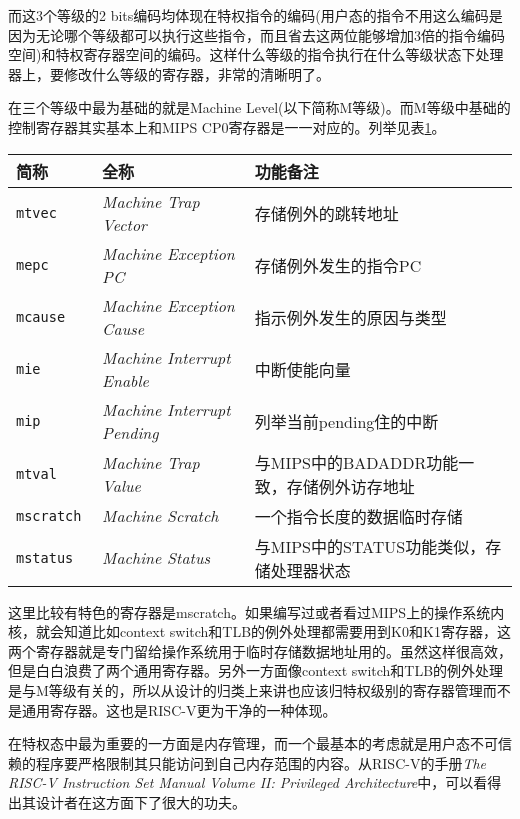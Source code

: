 \begin{enumerate}
	而这3个等级的2 bits编码均体现在特权指令的编码(用户态的指令不用这么编码是因为无论哪个等级都可以执行这些指令，而且省去这两位能够增加3倍的指令编码空间)和特权寄存器空间的编码。这样什么等级的指令执行在什么等级状态下处理器上，要修改什么等级的寄存器，非常的清晰明了。
	
	在三个等级中最为基础的就是Machine Level(以下简称M等级)。而M等级中基础的控制寄存器其实基本上和MIPS CP0寄存器是一一对应的。列举见表\ref{tab:sampleofCSR}。
	\begin{table}[!htbp]
		\label{tab:sampleofCSR}
		\centering
		\footnotesize%
		\setlength{\tabcolsep}{4pt}%
		\renewcommand{\arraystretch}{1.2}%
		\begin{tabular}{lll}
			\hline
			简称 & 全称 & 功能备注 \\%
			\hline
			\tt mtvec    & \textit{Machine Trap Vector}       & 存储例外的跳转地址 \\
			\tt mepc     & \textit{Machine Exception PC}      & 存储例外发生的指令PC \\
			\tt mcause   & \textit{Machine Exception Cause}   & 指示例外发生的原因与类型 \\
			\tt mie      & \textit{Machine Interrupt Enable}  & 中断使能向量 \\
			\tt mip      & \textit{Machine Interrupt Pending} & 列举当前pending住的中断 \\
			\tt mtval    & \textit{Machine Trap Value} & 与MIPS中的BADADDR功能一致，存储例外访存地址 \\
			\tt mscratch & \textit{Machine Scratch}    & 一个指令长度的数据临时存储 \\
			\tt mstatus  & \textit{Machine Status}     & 与MIPS中的STATUS功能类似，存储处理器状态 \\
			\hline
		\end{tabular}
	\end{table}
	
	这里比较有特色的寄存器是mscratch。如果编写过或者看过MIPS上的操作系统内核，就会知道比如context switch和TLB的例外处理都需要用到K0和K1寄存器，这两个寄存器就是专门留给操作系统用于临时存储数据地址用的。虽然这样很高效，但是白白浪费了两个通用寄存器。另外一方面像context switch和TLB的例外处理是与M等级有关的，所以从设计的归类上来讲也应该归特权级别的寄存器管理而不是通用寄存器。这也是RISC-V更为干净的一种体现。
	
	在特权态中最为重要的一方面是内存管理，而一个最基本的考虑就是用户态不可信赖的程序要严格限制其只能访问到自己内存范围的内容。从RISC-V的手册\textit{The RISC-V Instruction Set Manual Volume II: Privileged Architecture}中，可以看得出其设计者在这方面下了很大的功夫。
	

\end{enumerate}
